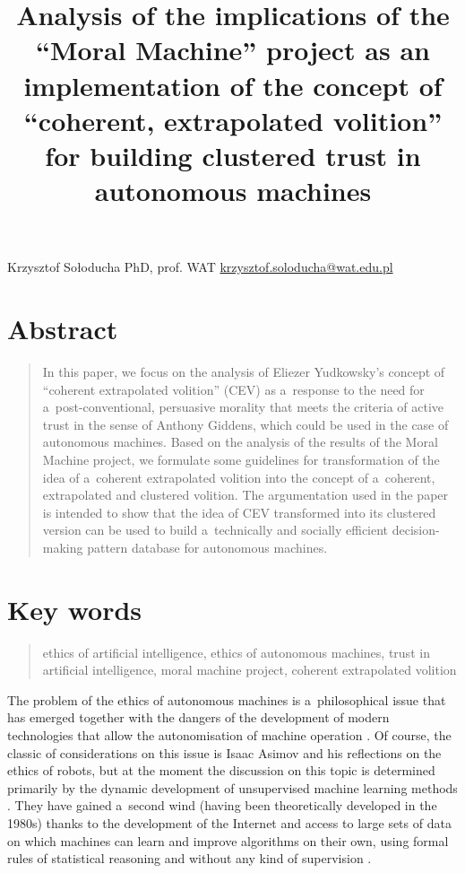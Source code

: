 

\title{Analysis of the implications of the ``Moral Machine'' project as an implementation of the concept of ``coherent, extrapolated volition'' for building clustered trust in autonomous machines}
\maketitle

Krzysztof Sołoducha PhD, prof. WAT \href{mailto:krzysztof.soloducha@wat.edu.pl}{krzysztof.soloducha@wat.edu.pl}

\section{Abstract}
\begin{quotation}
In this paper, we focus on the analysis of Eliezer Yudkowsky's concept of ``coherent extrapolated volition'' (CEV) as a~response to the need for a~post-conventional, persuasive morality that meets the criteria of active trust in the sense of Anthony Giddens, which could be used in the case of autonomous machines. Based on the analysis of the results of the Moral Machine project, we formulate some guidelines for transformation of the idea of a~coherent extrapolated volition into the concept of a~coherent, extrapolated and clustered volition. The argumentation used in the paper is intended to show that the idea of CEV transformed into its clustered version can be used to build a~technically and socially efficient decision-making pattern database for autonomous machines.

\end{quotation}
\section{Key words}
\begin{quotation}
ethics of artificial intelligence, ethics of autonomous machines, trust in artificial intelligence, moral machine project, coherent extrapolated volition

\end{quotation}
The problem of the ethics of autonomous machines is a~philosophical issue that has emerged together with the dangers of the development of modern technologies that allow the autonomisation of machine operation
\parencite[][]{pasquale_black_2016}. %
 Of course, the classic of considerations on this issue is Isaac Asimov 
\parencite*[][]{asimov_runaround_2004} %
 and his reflections on the ethics of robots, but at the moment the discussion on this topic is determined primarily by the dynamic development of unsupervised machine learning methods 
\parencite[][]{gryz_sztuczna_2021}. %
 They have gained a~second wind (having been theoretically developed in the 1980s) thanks to the development of the Internet and access to large sets of data on which machines can learn and improve algorithms on their own, using formal rules of statistical reasoning and without any kind of supervision 
\parencite[][]{burrell_how_2016}.%


